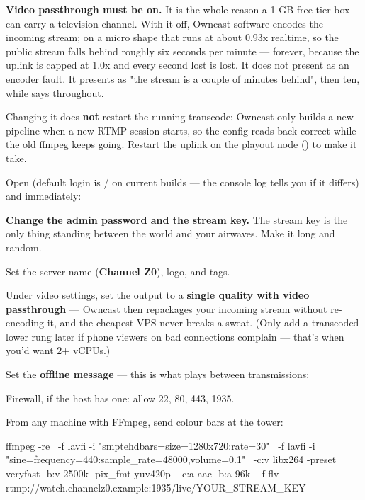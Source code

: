 \documentclass[fontpath=fonts/,logopath=logo/]{riposte-doc}
\begin{document}
\textbf{Video passthrough must be on.} It is the whole reason a 1 GB free-tier box can carry a television channel. With it off, Owncast software-encodes the incoming stream; on a micro shape that runs at about 0.93x realtime, so the public stream falls behind roughly six seconds per minute — forever, because the uplink is capped at 1.0x and every second lost is lost. It does not present as an encoder fault. It presents as "the stream is a couple of minutes behind", then ten, while  says  throughout.

Changing it does \textbf{not} restart the running transcode: Owncast only builds a new pipeline when a new RTMP session starts, so the config reads back correct while the old ffmpeg keeps going. Restart the uplink on the playout node () to make it take.

Open  (default login is  /  on current builds — the console log tells you if it differs) and immediately:

\begin{ripnumbers}
\item \textbf{Change the admin password and the stream key.} The stream key is the only thing standing between the world and your airwaves. Make it long and random.
\item Set the server name (\textbf{Channel Z0}), logo, and tags.
\item Under video settings, set the output to a \textbf{single quality with video passthrough} — Owncast then repackages your incoming stream without re-encoding it, and the cheapest VPS never breaks a sweat. (Only add a transcoded lower rung later if phone viewers on bad connections complain — that's when you'd want 2+ vCPUs.)
\item Set the \textbf{offline message} — this is what plays between transmissions: 
\item Firewall, if the host has one: allow 22, 80, 443, 1935.
\end{ripnumbers}



From any machine with FFmpeg, send colour bars at the tower:

\ripcodeopen
{}
\begin{ripcodeblock}
ffmpeg -re \
  -f lavfi -i "smptehdbars=size=1280x720:rate=30" \
  -f lavfi -i "sine=frequency=440:sample_rate=48000,volume=0.1" \
  -c:v libx264 -preset veryfast -b:v 2500k -pix_fmt yuv420p \
  -c:a aac -b:a 96k \
  -f flv rtmp://watch.channelz0.example:1935/live/YOUR_STREAM_KEY
\end{ripcodeblock}
\ripcodesizereset\ripcodeclose
\end{document}
